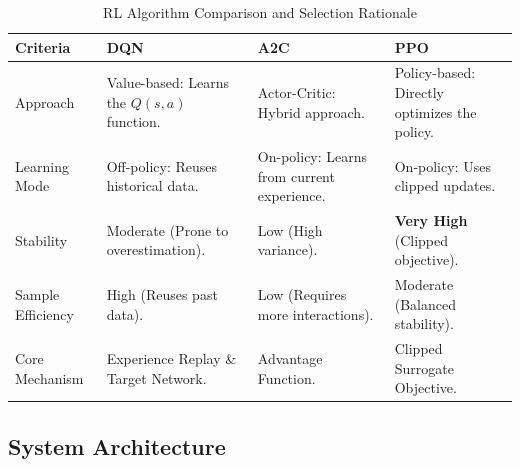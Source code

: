 \documentclass[12pt,a4paper]{report}
\begin{document}
\begin{table}[htbp]
\centering
\caption{RL Algorithm Comparison and Selection Rationale}
\label{tab:algorithm_comparison}
\begin{tabular}{L{2.5cm} L{3.5cm} L{3.5cm} L{4cm}}
\toprule
\textbf{Criteria} & \textbf{DQN} & \textbf{A2C} & \textbf{PPO} \\
\midrule
Approach & Value-based: Learns the $Q(s, a)$ function. & Actor-Critic: Hybrid approach. & Policy-based: Directly optimizes the policy. \\
Learning Mode & Off-policy: Reuses historical data. & On-policy: Learns from current experience. & On-policy: Uses clipped updates. \\
Stability & Moderate (Prone to overestimation). & Low (High variance). & \textbf{Very High} (Clipped objective). \\
Sample Efficiency & High (Reuses past data). & Low (Requires more interactions). & Moderate (Balanced stability). \\
Core Mechanism & Experience Replay \& Target Network. & Advantage Function. & Clipped Surrogate Objective. \\
\bottomrule
\end{tabular}
\end{table}

\subsection{System Architecture}
\end{document}
